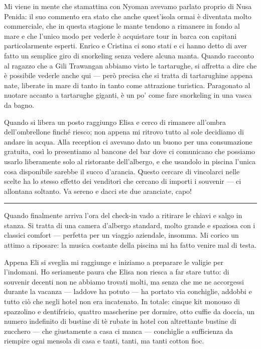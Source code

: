 Mi viene in mente che stamattina con Nyoman avevamo parlato proprio di Nusa Penida: il suo commento era stato che anche quest'isola ormai è diventata molto commerciale, che in questa stagione le mante tendono a rimanere in fondo al mare e che l'unico modo per vederle è acquistare tour in barca con capitani particolarmente esperti. Enrico e Cristina ci sono stati e ci hanno detto di aver fatto un semplice giro di snorkeling senza vedere alcuna manta. Quando racconto al ragazzo che a Gili Trawangan abbiamo visto le tartarughe, si affretta a dire che è possibile vederle anche qui — però precisa che si tratta di tartarughine appena nate, liberate in mare di tanto in tanto come attrazione turistica. Paragonato al nuotare accanto a tartarughe giganti, è un po' come fare snorkeling in una vasca da bagno.

Quando si libera un posto raggiungo Elisa e cerco di rimanere all'ombra dell'ombrellone finché riesco; non appena mi ritrovo tutto al sole decidiamo di andare in acqua. Alla reception ci avevano dato un buono per una consumazione gratuita, così lo presentiamo al bancone del bar dove ci comunicano che possiamo usarlo liberamente solo al ristorante dell'albergo, e che usandolo in piscina l'unica cosa disponibile sarebbe il succo d'arancia. Questo cercare di vincolarci nelle scelte ha lo stesso effetto dei venditori che cercano di importi i souvenir — ci allontana soltanto. Va sereno e dacci ste due aranciate, capo!

\begin{center}
    \noindent\rule{0.6\textwidth}{0.4pt}
\end{center}

Quando finalmente arriva l'ora del check-in vado a ritirare le chiavi e salgo in stanza. Si tratta di una camera d'albergo standard, molto grande e spaziosa con i classici comfort — perfetta per un viaggio aziendale, insomma. Mi corico un attimo a riposare: la musica costante della piscina mi ha fatto venire mal di testa.

Appena Eli si sveglia mi raggiunge e iniziamo a preparare le valigie per l'indomani. Ho seriamente paura che Elisa non riesca a far stare tutto: di souvenir decenti non ne abbiamo trovati molti, ma senza che me ne accorgessi durante la vacanza — laddove ha potuto — ha portato via conchiglie, addobbi e tutto ciò che negli hotel non era incatenato. In totale: cinque kit monouso di spazzolino e dentifricio, quattro mascherine per dormire, otto cuffie da doccia, un numero indefinito di bustine di tè rubate in hotel con altrettante bustine di zucchero — che giustamente a casa ci manca — conchiglie a sufficienza da riempire ogni mensola di casa e tanti, tanti, ma tanti cotton fioc.

